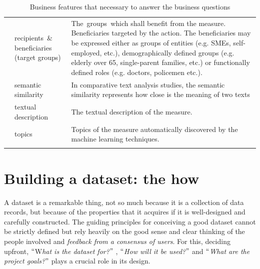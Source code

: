 {\begin{longtable}{p{1.16in}p{3.48in}p{0.62in}}
\hhline{---}
\multicolumn{1}{|p{0.33in}}{BF8} & 
\multicolumn{1}{|p{1.64in}}{recipients\ $\&$   beneficiaries (target groups)} & 
\multicolumn{1}{|p{3.47in}|}{The\ groups\ which shall benefit from the measure. Beneficiaries targeted by the action. The beneficiaries may be expressed either as groups of entities (e.g. SMEs, self-employed, etc.),   demographically defined groups (e.g. elderly over 65, single-parent families, etc.) or functionally defined roles (e.g. doctors, policemen etc.).} \\
\hhline{---}
\multicolumn{1}{|p{0.33in}}{BF9} & 
\multicolumn{1}{|p{1.64in}}{semantic similarity} & 
\multicolumn{1}{|p{3.47in}|}{In comparative text analysis studies, the semantic similarity represents how close is the meaning of two texts} \\
\hhline{---}
\multicolumn{1}{|p{0.33in}}{BF10} & 
\multicolumn{1}{|p{1.64in}}{textual description} & 
\multicolumn{1}{|p{3.47in}|}{The textual description of the measure. } \\
\hhline{---}
\multicolumn{1}{|p{0.33in}}{BF11} & 
\multicolumn{1}{|p{1.64in}}{topics} & 
\multicolumn{1}{|p{3.47in}|}{Topics of the measure automatically discovered by the machine learning techniques. } \\
\hhline{---}
\caption{Business features that necessary to answer the business questions}
\label{tab:Business features that necessary to answer the business questions}
\end{longtable}
}


\section{Building a dataset: the how}

A dataset is a remarkable thing, not so much because it is a collection of data records, but because of the properties that it acquires if it is well-designed and carefully constructed. The guiding principles for conceiving a good dataset cannot be strictly defined but rely heavily on the good sense and clear thinking of the people involved and \textit{feedback from a consensus of users}. For this, deciding upfront, $``$W\textit{hat is the dataset for?}$"$ , \textit{$``$How will it be used?$"$  }and \textit{$``$What are the project goals?$"$ } plays a crucial role in its design.

